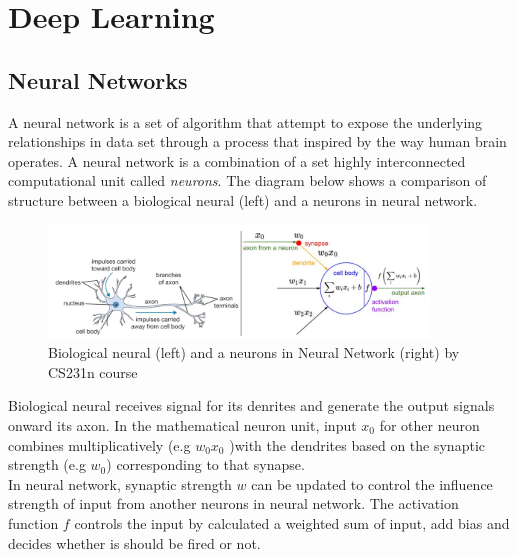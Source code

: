 \section{Deep Learning}
\subsection{Neural Networks}
\hspace{0.5cm}A neural network is a set of algorithm that attempt to expose the underlying relationships in data set through a process that inspired by the way human brain operates. A neural network is a combination of a set highly interconnected computational unit called \textit{neurons}. The diagram below shows a comparison of structure between a biological neural (left) and a neurons in neural network.
\begin{figure}[h!]
    \centering
    \includegraphics[width=0.9\textwidth]{Chapters/Fig/neural_arc.PNG}
    \caption{Biological neural (left) and a neurons in Neural Network (right) by CS231n course}
    \label{fig:nn_arc}
\end{figure}
Biological neural receives signal for its denrites and generate the output signals onward its axon. In the mathematical neuron unit, input $x_0$ for other neuron combines multiplicatively (e.g $w_0x_0$ )with the dendrites based on the synaptic strength (e.g $w_0$) corresponding to that synapse.\\
In neural network, synaptic strength $w$ can be updated to control the influence strength of input from another neurons in neural network. The activation function $f$ controls the input by calculated a weighted sum of input, add bias and decides whether is should be fired or not.
